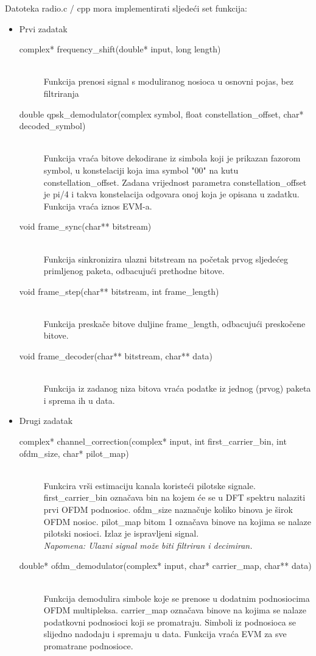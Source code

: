 \documentclass[a4paper]{article}
\begin{document}
Datoteka radio.c / cpp mora implementirati sljedeći set funkcija:
\begin{itemize}
\item Prvi zadatak
	\begin{description}
	\item[complex* frequency\_shift(double* input, long length)]
	\,\\ Funkcija prenosi signal s moduliranog nosioca u osnovni pojas, bez filtriranja
	\item[double qpsk\_demodulator(complex symbol, float constellation\_offset, char* decoded\_symbol)]
	\,\\ Funkcija vraća bitove dekodirane iz simbola koji je prikazan fazorom symbol, u konstelaciji koja ima symbol "00" na kutu constellation\_offset. Zadana vrijednost parametra constellation\_offset je pi/4 i takva konstelacija odgovara onoj koja je opisana u zadatku. Funkcija vraća iznos EVM-a.
	\item[void frame\_sync(char** bitstream)]
	\,\\ Funkcija sinkronizira ulazni bitstream na početak prvog sljedećeg primljenog paketa, odbacujući prethodne bitove.
	\item[void frame\_step(char** bitstream, int frame\_length)]
	\,\\ Funkcija preskače bitove duljine frame\_length, odbacujući preskočene bitove.
	\item[void frame\_decoder(char** bitstream, char** data)]
	\,\\ Funkcija iz zadanog niza bitova vraća podatke iz jednog (prvog) paketa i sprema ih u data.
	\end{description}
\item Drugi zadatak
	\begin{description}
	\item[complex* channel\_correction(complex* input, int first\_carrier\_bin, int ofdm\_size, char* pilot\_map)]
	\,\\ Funkcira vrši estimaciju kanala koristeći pilotske signale. first\_carrier\_bin označava bin na kojem će se u DFT spektru nalaziti prvi OFDM podnosioc. ofdm\_size naznačuje koliko binova je širok OFDM nosioc. pilot\_map bitom 1 označava binove na kojima se nalaze pilotski nosioci. Izlaz je ispravljeni signal.
	\\ \textit{Napomena: Ulazni signal može biti filtriran i decimiran.}
	\item[double* ofdm\_demodulator(complex* input, char* carrier\_map, char** data)]
	\,\\ Funkcija demodulira simbole koje se prenose u dodatnim podnosiocima OFDM multipleksa. carrier\_map označava binove na kojima se nalaze podatkovni podnosioci koji se promatraju. Simboli iz podnosioca se slijedno nadodaju i spremaju u data. Funkcija vraća EVM za sve promatrane podnosioce.

\end{description}
\end{itemize}
\end{document}
